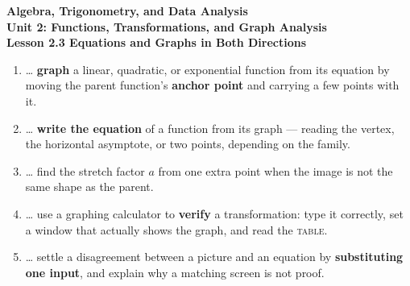 \documentclass[10pt]{article}
\begin{document}
\vspace{-0.8in}

\begin{center}
  {\color{white}\textbf{\LARGE Algebra, Trigonometry, and Data Analysis}}\\[4pt]
  {\color{mistmid}\large\textbf{Unit 2: Functions, Transformations, and Graph Analysis}}\\[6pt]
  {\color{white}\textbf{\large Lesson 2.3 \quad Equations and Graphs in Both Directions}}
\end{center}

\vspace{0.22in}
\namedateperiod
\vspace{0.18in}

\begin{learningtargetbox}
\small
\begin{enumerate}[leftmargin=1.5em, itemsep=5pt]
  \item \ldots{} \textbf{graph} a linear, quadratic, or exponential function from its equation by
        moving the parent function's \textbf{anchor point} and carrying a few points with it.
  \item \ldots{} \textbf{write the equation} of a function from its graph --- reading the vertex, the
        horizontal asymptote, or two points, depending on the family.
  \item \ldots{} find the stretch factor $a$ from one extra point when the image is not the same
        shape as the parent.
  \item \ldots{} use a graphing calculator to \textbf{verify} a transformation: type it correctly,
        set a window that actually shows the graph, and read the \textsc{table}.
  \item \ldots{} settle a disagreement between a picture and an equation by \textbf{substituting one
        input}, and explain why a matching screen is not proof.
\end{enumerate}
\end{learningtargetbox}

\vspace{0.14in}
\end{document}
